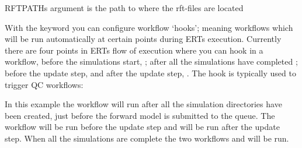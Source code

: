 \documentclass[letterpaper,10pt,english]{sphinxmanual}
\begin{document}
\begin{sphinxShadowBox}

RFTPATHs argument is the path to where the rft-files are located

%
\begin{sphinxVerbatim}[commandchars=\\\{\}]
  
\end{sphinxVerbatim}
\end{sphinxShadowBox}
\label{\detokenize{keywords/index:hook-workflow}}
With the keyword  you can configure workflow ‘hooks’;
meaning workflows which will be run automatically at certain points during ERTs
execution. Currently there are four points in ERTs flow of execution where you
can hook in a workflow, before the simulations start, ;
after all the simulations have completed ; before the
update step,  and after the update step, .
The  hook is typically used to trigger QC workflows:

%
\begin{sphinxVerbatim}[commandchars=\\\{\}]
         
    
   
         
         
\end{sphinxVerbatim}

In this example the workflow  will run after all the simulation
directories have been created, just before the forward model is submitted to the
queue. The workflow  will be run before the update step
and  will be run after the update step. When all the
simulations are complete the two workflows  and
 will be run.
\end{document}
